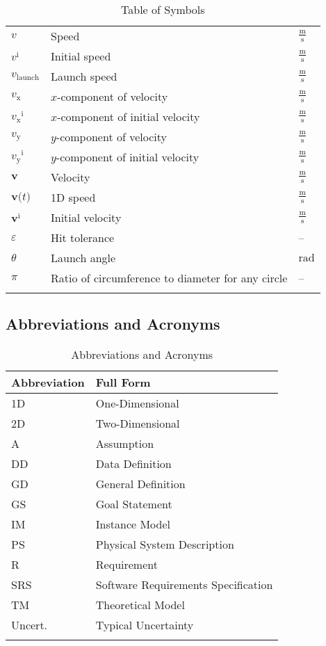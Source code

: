 \documentclass[12pt]{article}
\begin{document}
\begin{longtabu}{l X[l] l}
$v$ & Speed & $\frac{\text{m}}{\text{s}}$
\\
${v^{\text{i}}}$ & Initial speed & $\frac{\text{m}}{\text{s}}$
\\
${v_{\text{launch}}}$ & Launch speed & $\frac{\text{m}}{\text{s}}$
\\
${v_{\text{x}}}$ & $x$-component of velocity & $\frac{\text{m}}{\text{s}}$
\\
${{v_{\text{x}}}^{\text{i}}}$ & $x$-component of initial velocity & $\frac{\text{m}}{\text{s}}$
\\
${v_{\text{y}}}$ & $y$-component of velocity & $\frac{\text{m}}{\text{s}}$
\\
${{v_{\text{y}}}^{\text{i}}}$ & $y$-component of initial velocity & $\frac{\text{m}}{\text{s}}$
\\
$\mathbf{v}$ & Velocity & $\frac{\text{m}}{\text{s}}$
\\
$\mathbf{v}\text{(}t\text{)}$ & 1D speed & $\frac{\text{m}}{\text{s}}$
\\
${\mathbf{v}^{\text{i}}}$ & Initial velocity & $\frac{\text{m}}{\text{s}}$
\\
$ε$ & Hit tolerance & --
\\
$θ$ & Launch angle & ${\text{rad}}$
\\
$π$ & Ratio of circumference to diameter for any circle & --
\\
\bottomrule
\caption{Table of Symbols}
\label{Table:ToS}
\end{longtabu}
\subsection{Abbreviations and Acronyms}
\label{Sec:TAbbAcc}
\begin{longtable}{l l}
\toprule
\textbf{Abbreviation} & \textbf{Full Form}
\\
\midrule
\endhead
1D & One-Dimensional
\\
2D & Two-Dimensional
\\
A & Assumption
\\
DD & Data Definition
\\
GD & General Definition
\\
GS & Goal Statement
\\
IM & Instance Model
\\
PS & Physical System Description
\\
R & Requirement
\\
SRS & Software Requirements Specification
\\
TM & Theoretical Model
\\
Uncert. & Typical Uncertainty
\\
\bottomrule
\caption{Abbreviations and Acronyms}
\label{Table:TAbbAcc}
\end{longtable}
\end{document}
